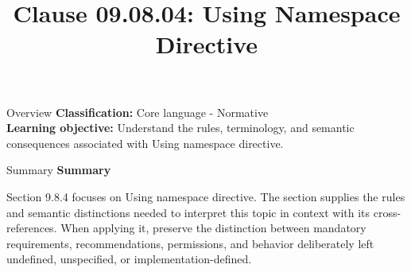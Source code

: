 \documentclass[10pt,letterpaper]{article}
\title{Clause 09.08.04: Using Namespace Directive}
\author{}
\date{}
\begin{document}
\maketitle
\begin{CornellOverviewBox}{Overview}
\textbf{Classification:} Core language - Normative\\[2pt]
\textbf{Learning objective:} Understand the rules, terminology, and semantic consequences associated with Using namespace directive.
\end{CornellOverviewBox}\begin{CornellSummaryBox}{Summary}
{\sffamily\bfseries\color{Accent} Summary}\par\vspace{3pt}Section 9.8.4 focuses on Using namespace directive. The section supplies the rules and semantic distinctions needed to interpret this topic in context with its cross-references. When applying it, preserve the distinction between mandatory requirements, recommendations, permissions, and behavior deliberately left undefined, unspecified, or implementation-defined.
\end{CornellSummaryBox}
\end{document}
